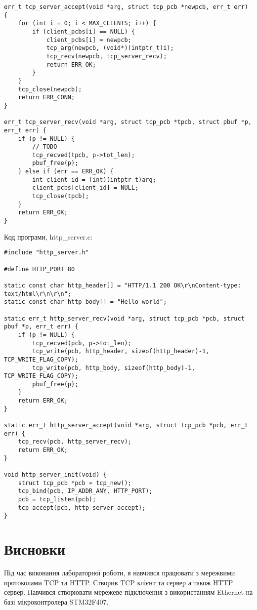 \documentclass[oneside,14pt]{extarticle}
\begin{document}
\begin{normalsize}
{\begin{lstlisting}
err_t tcp_server_accept(void *arg, struct tcp_pcb *newpcb, err_t err) {
    for (int i = 0; i < MAX_CLIENTS; i++) {
        if (client_pcbs[i] == NULL) {
            client_pcbs[i] = newpcb;
            tcp_arg(newpcb, (void*)(intptr_t)i);
            tcp_recv(newpcb, tcp_server_recv);
            return ERR_OK;
        }
    }
    tcp_close(newpcb);
    return ERR_CONN;
}

err_t tcp_server_recv(void *arg, struct tcp_pcb *tpcb, struct pbuf *p, err_t err) {
    if (p != NULL) {
    	// TODO
        tcp_recved(tpcb, p->tot_len);
        pbuf_free(p);
    } else if (err == ERR_OK) {
        int client_id = (int)(intptr_t)arg;
        client_pcbs[client_id] = NULL;
        tcp_close(tpcb);
    }
    return ERR_OK;
}\end{lstlisting}}

Код програми, http\_server.c:
  
{\small\begin{lstlisting}
#include "http_server.h"

#define HTTP_PORT 80

static const char http_header[] = "HTTP/1.1 200 OK\r\nContent-type: text/html\r\n\r\n";
static const char http_body[] = "Hello world";

static err_t http_server_recv(void *arg, struct tcp_pcb *pcb, struct pbuf *p, err_t err) {
    if (p != NULL) {
        tcp_recved(pcb, p->tot_len);
        tcp_write(pcb, http_header, sizeof(http_header)-1, TCP_WRITE_FLAG_COPY);
        tcp_write(pcb, http_body, sizeof(http_body)-1, TCP_WRITE_FLAG_COPY);
        pbuf_free(p);
    }
    return ERR_OK;
}

static err_t http_server_accept(void *arg, struct tcp_pcb *pcb, err_t err) {
    tcp_recv(pcb, http_server_recv);
    return ERR_OK;
}

void http_server_init(void) {
    struct tcp_pcb *pcb = tcp_new();
    tcp_bind(pcb, IP_ADDR_ANY, HTTP_PORT);
    pcb = tcp_listen(pcb);
    tcp_accept(pcb, http_server_accept);
}\end{lstlisting}}
	
	\section*{Висновки}
	Під час виконання лабораторної роботи, я навчився працювати з мережвими протоколами TCP та HTTP. Створив TCP клієнт та сервер а також HTTP сервер. Навчився створювати мережеве підключення з використанням Ethernet на базі мікроконтролера STM32F407.
	    
\end{normalsize}
\end{document}
